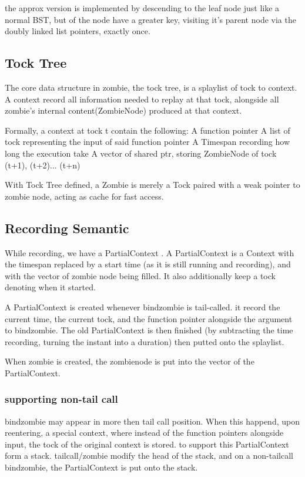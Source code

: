 the approx version is implemented by descending to the leaf node just like a normal BST, but of the node have a greater key, visiting it's parent node via the doubly linked list pointers, exactly once.

\subsection{Tock Tree}
The core data structure in zombie, the tock tree, is a splaylist of tock to context. A context record all information needed to replay at that tock, alongside all zombie's internal content(ZombieNode) produced at that context.

Formally, a context at tock t contain the following:
A function pointer 
A list of tock representing the input of said function pointer
A Timespan recording how long the execution take
A vector of shared ptr, storing ZombieNode of tock (t+1), (t+2)... (t+n)

With Tock Tree defined, a Zombie is merely a Tock paired with a weak pointer to zombie node, acting as cache for fast access.

\subsection{Recording Semantic}
While recording, we have a PartialContext . A PartialContext is a Context with the timespan replaced by a start time (as it is still running and recording), and with the vector of zombie node being filled. It also additionally keep a tock denoting when it started.

A PartialContext is created whenever bindzombie is tail-called. it record the current time, the current tock, and the function pointer alongside the argument to bindzombie. The old PartialContext is then finished (by subtracting the time recording, turning the instant into a duration) then putted onto the splaylist.

When zombie is created, the zombienode is put into the vector of the PartialContext.
\subsubsection{supporting non-tail call}
bindzombie may appear in more then tail call position. When this happend, upon reentering, a special context, where instead of the function pointers alongside input, the tock of the original context is stored.
to support this PartialContext form a stack. tailcall/zombie modify the head of the stack, and on a non-tailcall bindzombie, the PartialContext is put onto the stack.
